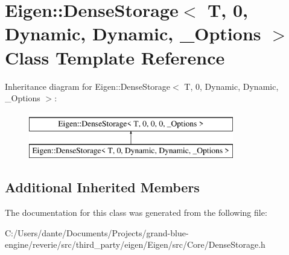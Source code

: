 \hypertarget{class_eigen_1_1_dense_storage_3_01_t_00_010_00_01_dynamic_00_01_dynamic_00_01___options_01_4}{}\section{Eigen\+::Dense\+Storage$<$ T, 0, Dynamic, Dynamic, \+\_\+\+Options $>$ Class Template Reference}
\label{class_eigen_1_1_dense_storage_3_01_t_00_010_00_01_dynamic_00_01_dynamic_00_01___options_01_4}
Inheritance diagram for Eigen\+::Dense\+Storage$<$ T, 0, Dynamic, Dynamic, \+\_\+\+Options $>$\+:\begin{figure}[H]
\begin{center}
\leavevmode
\includegraphics[height=2.000000cm]{class_eigen_1_1_dense_storage_3_01_t_00_010_00_01_dynamic_00_01_dynamic_00_01___options_01_4}
\end{center}
\end{figure}
\subsection*{Additional Inherited Members}


The documentation for this class was generated from the following file\+:\begin{DoxyCompactItemize}
\item 
C\+:/\+Users/dante/\+Documents/\+Projects/grand-\/blue-\/engine/reverie/src/third\+\_\+party/eigen/\+Eigen/src/\+Core/Dense\+Storage.\+h\end{DoxyCompactItemize}
